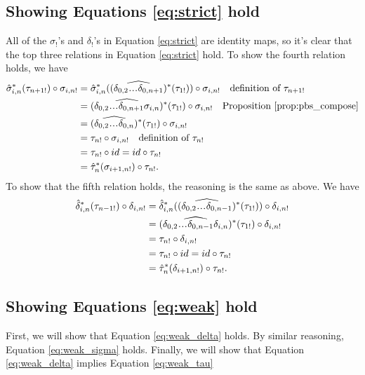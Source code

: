 \subsection{Showing Equations \ref{eq:strict} hold}
All of the $\sigma_!$'s and $\delta_!$'s in Equation 
\ref{eq:strict} are identity maps, so it's clear that 
the top three relations in Equation \ref{eq:strict} 
hold. To show the fourth relation holds, we have
\begin{align*}
\hat{\sigma}_{i,n}^*(\tau_{n+1!}) \circ \sigma_{i,n!} 
&= 
\hat{\sigma}_{i,n}^*(
  (\widehat{\delta_{0,2}\smdots\delta_{0,n+1}})^*
  (\tau_{1!})) \circ \sigma_{i,n!}
  \quad \textrm{definition of }\tau_{n+1!}\\
&= 
(\widehat{\delta_{0,2}\smdots\delta_{0,n+1}\sigma_{i,n}})^*
  (\tau_{1!}) \circ \sigma_{i,n!}
  \quad \textrm{Proposition } \ref{prop:pbs_compose}\\
&= 
(\widehat{\delta_{0,2}\smdots\delta_{0,n}})^*
  (\tau_{1!}) \circ \sigma_{i,n!}\\
&= 
\tau_{n!} \circ \sigma_{i,n!}
  \quad \textrm{definition of }\tau_{n!}\\
&= 
\tau_{n!} \circ id  
  = id \circ \tau_{n!} \\
&= 
\hat{\tau}_n^*(\sigma_{i+1,n!}) \circ \tau_{n!}.
\end{align*}
To show that the fifth relation holds, the 
reasoning is the same as above. We have
\begin{align*}
\hat{\delta}_{i,n}^*(\tau_{n-1!}) \circ \delta_{i,n!} 
&= 
\hat{\delta}_{i,n}^*
  ((\widehat{\delta_{0,2}\smdots\delta_{0,n-1}})^*
  (\tau_{1!})) \circ \delta_{i,n!} \\
&=
(\widehat{\delta_{0,2}\smdots\delta_{0,n-1}\delta_{i,n}})^*
  (\tau_{1!}) \circ \delta_{i,n!} \\
&=
\tau_{n!} \circ \delta_{i,n!}\\
&= 
\tau_{n!} \circ id   
  = id \circ \tau_{n!}\\
&=
\hat{\tau}_n^*(\delta_{i+1,n!}) \circ \tau_{n!}.
\end{align*} 
%
\subsection{Showing Equations \ref{eq:weak} hold}
First, we will show that Equation 
\ref{eq:weak_delta} holds. By similar 
reasoning, Equation \ref{eq:weak_sigma} holds. 
Finally, we will show that Equation 
\ref{eq:weak_delta} implies Equation 
\ref{eq:weak_tau}